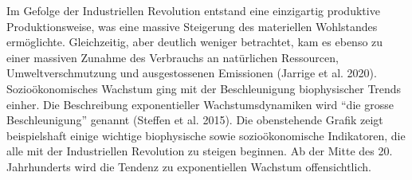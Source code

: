 \documentclass[
  nswissgerman,
  a4paper,
  DIV=11,
  numbers=noendperiod,
  oneside,
  openany]{scrreprt}
\begin{document}
Im Gefolge der Industriellen Revolution entstand eine einzigartig
produktive Produktionsweise, was eine massive Steigerung des materiellen
Wohlstandes ermöglichte. Gleichzeitig, aber deutlich weniger betrachtet,
kam es ebenso zu einer massiven Zunahme des Verbrauchs an natürlichen
Ressourcen, Umweltverschmutzung und ausgestossenen Emissionen (Jarrige
et al. 2020). Sozioökonomisches Wachstum ging mit der Beschleunigung
biophysischer Trends einher. Die Beschreibung exponentieller
Wachstumsdynamiken wird ``die grosse Beschleunigung'' genannt (Steffen
et al. 2015). Die obenstehende Grafik zeigt beispielshaft einige
wichtige biophysische sowie sozioökonomische Indikatoren, die alle mit
der Industriellen Revolution zu steigen beginnen. Ab der Mitte des 20.
Jahrhunderts wird die Tendenz zu exponentiellen Wachstum offensichtlich.
\end{document}
